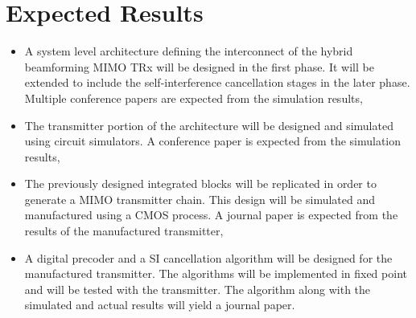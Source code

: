 \documentclass[onecolumn,draftcls,journal]{IEEEtran}
\begin{document}
\IEEEpubidadjcol
\vspace{-.2in}
\section{Expected Results}
\vspace{-.1in}
\begin{itemize}
\item A system level architecture defining the interconnect of the hybrid beamforming MIMO TRx will be designed in the first phase. It will be extended to include the self-interference cancellation stages in the later phase. Multiple conference papers are expected from the simulation results,
\item The transmitter portion of the architecture will be designed and simulated using circuit simulators. A conference paper is expected from the simulation results,
\item The previously designed integrated blocks will be replicated in order to generate a MIMO transmitter chain. This design will be simulated and manufactured using a CMOS process. A journal paper is expected from the results of the manufactured transmitter,
\item A digital precoder and a SI cancellation algorithm will be designed for the manufactured transmitter. The algorithms will be implemented in fixed point and will be tested with the transmitter. The algorithm along with  the simulated and actual results will yield a journal paper.
\end{itemize}
\end{document}

